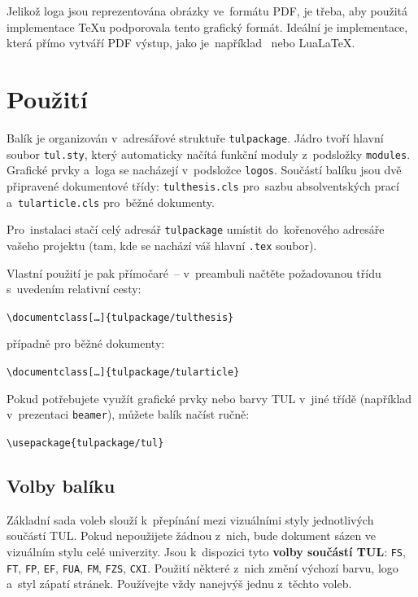 \documentclass[a4paper,12pt,fonts,numbering,listingsleft]{./tulpackage/tularticle}
\newcommand{\cmdfont}[1]{\texttt{\color{\tulcolor}#1}}
\newcommand{\cmdnoindex}[1]{\cmdfont{\textbackslash{}#1}}
\begin{document}
Jelikož loga jsou reprezentována obrázky ve~formátu PDF, je třeba, aby použitá
implementace \TeX{}u podporovala tento grafický formát. Ideální je implementace,
která přímo vytváří PDF výstup, jako je~například \XeLaTeX\ nebo Lua\LaTeX.


\section{Použití}

Balík je organizován v~adresářové struktuře \cmdfont{tulpackage}. Jádro tvoří
hlavní soubor \cmdfont{tul.sty}, který automaticky načítá funkční moduly
z~podsložky \cmdfont{modules}. Grafické prvky a~loga se nacházejí v~podsložce
\cmdfont{logos}. Součástí balíku jsou dvě připravené dokumentové třídy:
\cmdfont{tulthesis.cls} pro~sazbu absolventských prací a~\cmdfont{tularticle.cls}
pro~běžné dokumenty.

Pro~instalaci stačí celý adresář \cmdfont{tulpackage} umístit do~kořenového
adresáře vašeho projektu (tam, kde se nachází váš hlavní \texttt{.tex} soubor).

Vlastní použití je pak přímočaré~-- v~preambuli načtěte požadovanou třídu
s~uvedením relativní cesty:

\begin{listing}
    \cmdnoindex{documentclass}\cmdfont{[\ldots]\{tulpackage/tulthesis\}}
\end{listing}

případně pro běžné dokumenty:

\begin{listing}
    \cmdnoindex{documentclass}\cmdfont{[\ldots]\{tulpackage/tularticle\}}
\end{listing}

Pokud potřebujete využít grafické prvky nebo barvy TUL v~jiné třídě (například
v~prezentaci \cmdfont{beamer}), můžete balík načíst ručně:

\begin{listing}
    \cmdnoindex{usepackage}\cmdfont{\{tulpackage/tul\}}
\end{listing}

\clearpage

\subsection*{Volby balíku}

Základní sada voleb slouží k~přepínání mezi vizuálními styly jednotlivých
součástí TUL\@. Pokud nepoužijete žádnou z~nich, bude dokument sázen ve
vizuálním stylu celé univerzity. Jsou k~dispozici tyto
\textbf{volby součástí TUL}: \cmdfont{FS}, \cmdfont{FT}, \cmdfont{FP},
\cmdfont{EF}, \cmdfont{FUA}, \cmdfont{FM}, \cmdfont{FZS}, \cmdfont{CXI}.
Použití některé z~nich změní výchozí barvu, logo a~styl zápatí stránek.
Používejte vždy nanejvýš jednu z~těchto voleb.
\end{document}
